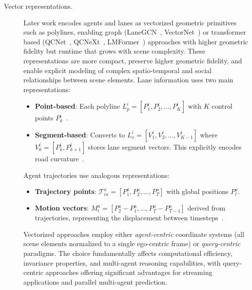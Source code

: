 \begin{description}
\item[Vector representations.] Later work encodes agents and lanes as vectorized geometric primitives such as polylines, enabling graph (LaneGCN~\cite{liang2020learning}, VectorNet~\cite{VectorNet2020}) or transformer based (QCNet~\cite{qcnetZhou2023}, QCNeXt~\cite{qcnextZhou2023}, LMFormer~\cite{lmformerYadav2025}) approaches with higher geometric fidelity but runtime that grows with scene complexity. These representations are more compact, preserve higher geometric fidelity, and enable explicit modeling of complex spatio-temporal and social relationships between scene elements. Lane information uses two main representations:
\begin{itemize}
  \item \textbf{Point-based}: Each polyline \(L_p^i = [P_1^i, P_2^i, \ldots, P_K^i]\) with \(K\) control points \(P_k^i\)~\cite{VectorNet2020, zhou2022hivt}.
  \item \textbf{Segment-based}: Converts to \(L_v^i = [V_1^i, V_2^i, \ldots, V_{K-1}^i]\) where \(V_{k}^i = [P_k^i, P_{k+1}^i]\) stores lane segment vectors. This explicitly encodes road curvature~\cite{liang2020learning,zhou2022hivt,qcnetZhou2023}.
\end{itemize}
Agent trajectories use analogous representations:
\begin{itemize}
  \item \textbf{Trajectory points}: \(\mathcal{T}_{in}^a = [P_1^a, P_2^a, \ldots, P_T^a]\) with global positions \(P_t^a\).
  \item \textbf{Motion vectors}: \(M_t^a = [P_{2}^a - P_{1}^a, \ldots, P_{T}^a - P_{T-1}^a]\) derived from trajectories, representing the displacement between timesteps~\cite{lmformerYadav2025}.
\end{itemize}
Vectorized approaches employ either \emph{agent-centric} coordinate systems (all scene elements normalized to a single ego-centric frame) or \emph{query-centric}~\cite{qcnetZhou2023} paradigms. The choice fundamentally affects computational efficiency, invariance properties, and multi-agent reasoning capabilities, with query-centric approaches offering significant advantages for streaming applications and parallel multi-agent prediction. %
\end{description}

